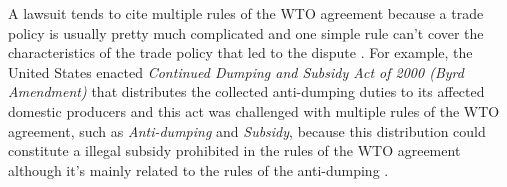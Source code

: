 A lawsuit tends to cite multiple rules of the WTO agreement because a trade policy is usually pretty much complicated
and one simple rule can't cover the characteristics of the trade policy that led to the dispute \citep{palmeter2004dispute}.
For example, the United States enacted \textit{Continued Dumping and Subsidy Act of 2000 (Byrd Amendment)} that distributes
the collected anti-dumping duties to its affected domestic producers and this act was challenged with multiple rules of the WTO agreement,
such as \textit{Anti-dumping} and \textit{Subsidy}, because
this distribution could constitute a illegal subsidy prohibited
in the rules of the WTO agreement although it's mainly related to the rules of the anti-dumping \citep{cdsoa}.
 

